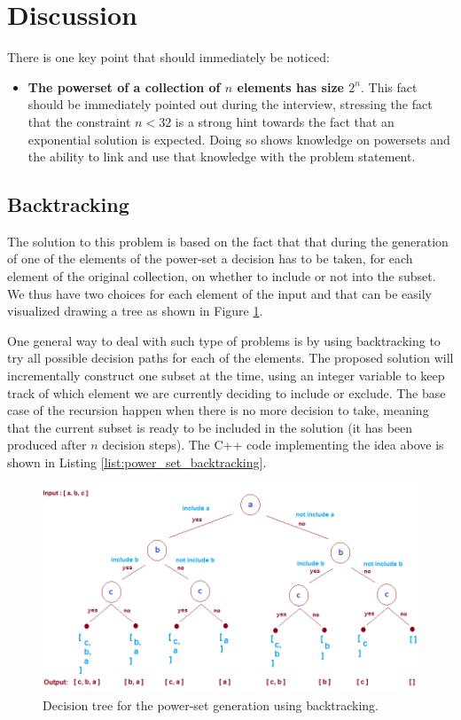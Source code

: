 \section{Discussion}
There is one key point that should immediately be noticed:
\begin{itemize}
	\item \textbf{The powerset of a collection of $n$ elements has size $2^n$}. This fact should be immediately pointed out during the interview, stressing the fact that the constraint $n < 32$ is a strong hint towards the fact that an exponential solution is expected. Doing so shows knowledge on powersets and the ability to link and use that knowledge with the problem statement.
\end{itemize}

\subsection{Backtracking}
The solution to this problem is based on the fact that that during the generation of one of the elements of the power-set a decision has to be taken, for each element of the original collection, on whether to include or not into the subset.
We thus have two choices for each element of the input and that can be easily visualized drawing a tree as shown in Figure \ref{ref:power_set_decision_trees}.

One general way to deal with such type of problems is by using backtracking to try all possible decision paths for each of the elements. The proposed solution will incrementally construct one subset at the time, using an integer variable to keep track of which element we are currently deciding to include or exclude.
The base case of the recursion happen when there is no more decision to take, meaning that the current subset is ready to be included in the solution (it has been produced after $n$ decision steps).
The C++ code implementing the idea above is shown in Listing \ref{list:power_set_backtracking}.


\begin{figure}
	\label{ref:power_set_decision_trees}
	\centering
	\includegraphics[scale=2.0]{sources/power_set/images/subsetTree}
	\caption{Decision tree for the power-set generation using backtracking.}
\end{figure}

